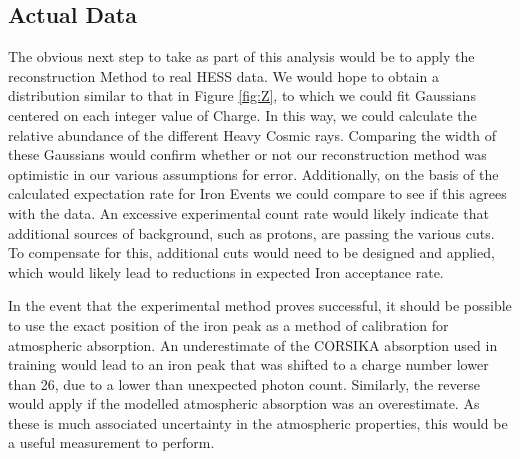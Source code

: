 \documentclass[11pt]{article}
\begin{document}
\subsection{Actual Data}
The obvious next step to take as part of this analysis would be to apply the reconstruction Method to real HESS data. We would hope to obtain a distribution similar to that in Figure \ref{fig:Z}, to which we could fit Gaussians centered on each integer value of Charge. In this way, we could calculate the relative abundance of the different Heavy Cosmic rays. Comparing the width of these Gaussians would confirm whether or not our reconstruction method was optimistic in our various assumptions for error. Additionally, on the basis of the calculated expectation rate for Iron Events we could compare to see if this agrees
with the data. An excessive experimental count rate would likely indicate that additional sources of background, such as protons, are passing the various cuts. To compensate for this, additional cuts would need to be designed and applied, which would likely lead to reductions in expected Iron acceptance rate.

In the event that the experimental method proves successful, it should be possible to use the exact position of the iron peak as a method of calibration for atmospheric absorption. An underestimate of the CORSIKA absorption used in training would lead to an iron peak that was shifted to a charge number lower than 26, due to a lower than unexpected photon count. Similarly, the reverse would apply if the modelled atmospheric absorption was an overestimate. As these is much associated uncertainty in the atmospheric properties, this would be a useful measurement to perform.
\end{document}
